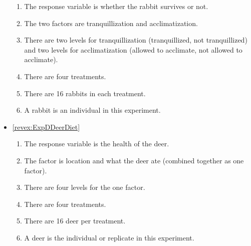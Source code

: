 \documentclass[10pt,openany]{book}\usepackage[]{graphicx}\usepackage[]{color}
\begin{document}
\begin{itemize}
\begin{enumerate}
      \item The response variable is whether the rabbit survives or not.
      \item The two factors are tranquillization and acclimatization.
      \item There are two levels for tranquillization (tranquillized, not tranquillized) and two levels for acclimatization (allowed to acclimate, not allowed to acclimate).
      \item There are four treatments.
      \item There are 16 rabbits in each treatment.
      \item A rabbit is an individual in this experiment.
    \end{enumerate}

  \item \hypertarget{ans:ExpDDeerDiet}{\ref{revex:ExpDDeerDiet}}
    \begin{enumerate}
      \item The response variable is the health of the deer.
      \item The factor is location and what the deer ate (combined together as one factor).
      \item There are four levels for the one factor.
      \item There are four treatments.
      \item There are 16 deer per treatment.
      \item A deer is the individual or replicate in this experiment.
    \end{enumerate}


\end{itemize}
\end{document}
